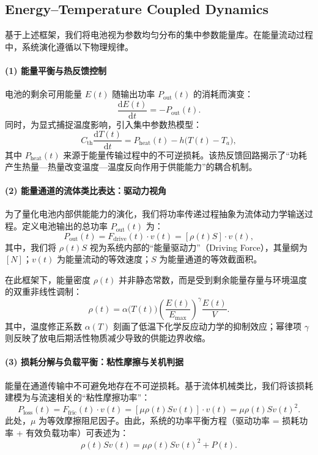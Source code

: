 \documentclass[11pt]{article}
\begin{document}
\subsection{Energy--Temperature Coupled Dynamics}
基于上述框架，我们将电池视为参数均匀分布的集中参数能量库。在能量流动过程中，系统演化遵循以下物理规律。

\paragraph{(1) 能量平衡与热反馈控制}
电池的剩余可用能量 $E(t)$ 随输出功率 $P_{\text{out}}(t)$ 的消耗而演变：
\begin{equation}
  \frac{\mathrm{d}E(t)}{\mathrm{d}t} = -P_{\text{out}}(t).
\end{equation}
同时，为显式捕捉温度影响，引入集中参数热模型：
\begin{equation}
  C_{\text{th}}\frac{\mathrm{d}T(t)}{\mathrm{d}t} = P_{\text{heat}}(t) - h\bigl(T(t)-T_a\bigr),
\end{equation}
其中 $P_{\text{heat}}(t)$ 来源于能量传输过程中的不可逆损耗。该热反馈回路揭示了“功耗产生热量—热量改变温度—温度反向作用于供能能力”的耦合机制。

\paragraph{(2) 能量通道的流体类比表达：驱动力视角}
为了量化电池内部供能能力的演化，我们将功率传递过程抽象为流体动力学输送过程。定义电池输出的总功率 $P_{\text{out}}(t)$ 为：
\begin{equation}
  P_{\text{out}}(t) = F_{\text{drive}}(t) \cdot v(t) = \left[ \rho(t) S \right] \cdot v(t),
\end{equation}
其中，我们将 $\rho(t) S$ 视为系统内部的“能量驱动力”（Driving Force），其量纲为 $[N]$；$v(t)$ 为能量流动的等效速度；$S$ 为能量通道的等效截面积。

在此框架下，能量密度 $\rho(t)$ 并非静态常数，而是受到剩余能量存量与环境温度的双重非线性调制：
\begin{equation}
  \rho(t) = \alpha\bigl(T(t)\bigr) \left( \frac{E(t)}{E_{\max}} \right)^{\gamma} \frac{E(t)}{V}.
\end{equation}
其中，温度修正系数 $\alpha(T)$ 刻画了低温下化学反应动力学的抑制效应；幂律项 $\gamma$ 则反映了放电后期活性物质减少导致的供能边界收缩。

\paragraph{(3) 损耗分解与负载平衡：粘性摩擦与关机判据}
能量在通道传输中不可避免地存在不可逆损耗。基于流体机械类比，我们将该损耗建模为与流速相关的“粘性摩擦功率”：
\begin{equation}
  P_{\text{loss}}(t) = F_{\text{fric}}(t) \cdot v(t) = \left[ \mu \rho(t) S v(t) \right] \cdot v(t) = \mu \rho(t) S v(t)^2.
\end{equation}
此处，$\mu$ 为等效摩擦阻尼因子。由此，系统的功率平衡方程（驱动功率 = 损耗功率 + 有效负载功率）可表述为：
\begin{equation}
  \rho(t) S v(t) = \mu \rho(t) S v(t)^2 + P(t). \label{eq:power_balance}
\end{equation}
\end{document}
